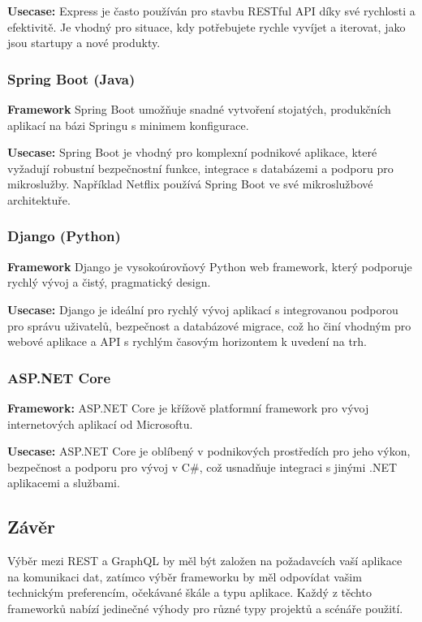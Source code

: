 \textbf{Usecase:} Express je často používán pro stavbu RESTful API díky své rychlosti a efektivitě. Je vhodný pro situace, kdy potřebujete rychle vyvíjet a iterovat, jako jsou startupy a nové produkty.

\subsubsection*{Spring Boot (Java)}
\textbf{Framework} Spring Boot umožňuje snadné vytvoření stojatých, produkčních aplikací na bázi Springu s minimem konfigurace.

\textbf{Usecase:} Spring Boot je vhodný pro komplexní podnikové aplikace, které vyžadují robustní bezpečnostní funkce, integrace s databázemi a podporu pro mikroslužby. Například Netflix používá Spring Boot ve své mikroslužbové architektuře.

\subsubsection*{Django (Python)}
\textbf{Framework} Django je vysokoúrovňový Python web framework, který podporuje rychlý vývoj a čistý, pragmatický design.

\textbf{Usecase:} Django je ideální pro rychlý vývoj aplikací s integrovanou podporou pro správu uživatelů, bezpečnost a databázové migrace, což ho činí vhodným pro webové aplikace a API s rychlým časovým horizontem k uvedení na trh.

\subsubsection*{ASP.NET Core}
\textbf{Framework:} ASP.NET Core je křížově platformní framework pro vývoj internetových aplikací od Microsoftu.

\textbf{Usecase:} ASP.NET Core je oblíbený v podnikových prostředích pro jeho výkon, bezpečnost a podporu pro vývoj v C\#, což usnadňuje integraci s jinými .NET aplikacemi a službami.

\subsection*{Závěr}
Výběr mezi REST a GraphQL by měl být založen na požadavcích vaší aplikace na komunikaci dat, zatímco výběr frameworku by měl odpovídat vašim technickým preferencím, očekávané škále a typu aplikace. Každý z těchto frameworků nabízí jedinečné výhody pro různé typy projektů a scénáře použití.